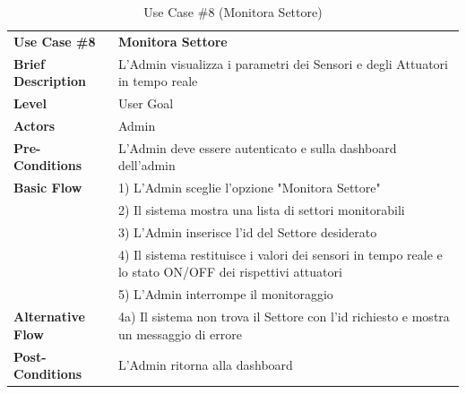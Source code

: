 \documentclass{article}
\begin{document}
    
    \begin{table}[h]
        \begin{tabularx}{\textwidth}{ | l  X | }
            \rowcolor{lightgray!70}
            \hline
            \textbf{Use Case \#8} & \textbf{Monitora Settore }\\[0.5ex]
            \textbf{Brief Description} & L'Admin visualizza i parametri dei Sensori e degli Attuatori in tempo reale \\
            \rowcolor{blue!10}
            \textbf{Level} & User Goal \\
            \textbf{Actors} & Admin \\
            \rowcolor{blue!10}
            \textbf{Pre-Conditions} & L'Admin deve essere autenticato e sulla dashboard dell'admin\\
            \textbf{Basic Flow} & 1) L'Admin sceglie l'opzione "Monitora Settore"\\
            & 2) Il sistema mostra una lista di settori monitorabili\\
            & 3) L'Admin inserisce l'id del Settore desiderato\\
            & 4) Il sistema restituisce i valori dei sensori in tempo reale e lo stato ON/OFF dei rispettivi attuatori\\
            & 5) L'Admin interrompe il monitoraggio\\
            \rowcolor{blue!10}
            \textbf{Alternative Flow} & 4a) Il sistema non trova il Settore con l'id richiesto e mostra un messaggio di errore\\
            \textbf{Post-Conditions} & L'Admin ritorna alla dashboard \\
            \hline
        \end{tabularx}
        \label{use_case_8}
        \caption{Use Case \#8 (Monitora Settore)}
    \end{table}
\end{document}
